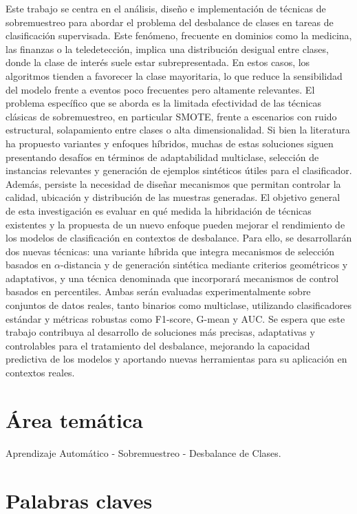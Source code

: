 \documentclass[12pt,a4paper]{article}
\begin{document}
Este trabajo se centra en el análisis, diseño e implementación de técnicas de sobremuestreo para abordar el problema del desbalance de clases en tareas de clasificación supervisada. Este fenómeno, frecuente en dominios como la medicina, las finanzas o la teledetección, implica una distribución desigual entre clases, donde la clase de interés suele estar subrepresentada. En estos casos, los algoritmos tienden a favorecer la clase mayoritaria, lo que reduce la sensibilidad del modelo frente a eventos poco frecuentes pero altamente relevantes.
El problema específico que se aborda es la limitada efectividad de las técnicas clásicas de sobremuestreo, en particular SMOTE, frente a escenarios con ruido estructural, solapamiento entre clases o alta dimensionalidad. Si bien la literatura ha propuesto variantes y enfoques híbridos, muchas de estas soluciones siguen presentando desafíos en términos de adaptabilidad multiclase, selección de instancias relevantes y generación de ejemplos sintéticos útiles para el clasificador. Además, persiste la necesidad de diseñar mecanismos que permitan controlar la calidad, ubicación y distribución de las muestras generadas.
El objetivo general de esta investigación es evaluar en qué medida la hibridación de técnicas existentes y la propuesta de un nuevo enfoque pueden mejorar el rendimiento de los modelos de clasificación en contextos de desbalance. Para ello, se desarrollarán dos nuevas técnicas: una variante híbrida que integra mecanismos de selección basados en $ \alpha $-distancia y de generación sintética mediante criterios geométricos y adaptativos, y una técnica denominada que incorporará mecanismos de control basados en percentiles. Ambas serán evaluadas experimentalmente sobre conjuntos de datos reales, tanto binarios como multiclase, utilizando clasificadores estándar y métricas robustas como F1-score, G-mean y AUC.
Se espera que este trabajo contribuya al desarrollo de soluciones más precisas, adaptativas y controlables para el tratamiento del desbalance, mejorando la capacidad predictiva de los modelos y aportando nuevas herramientas para su aplicación en contextos reales.


\section{Área temática}

Aprendizaje Automático - Sobremuestreo - Desbalance de Clases.

\section{Palabras claves}
\end{document}
